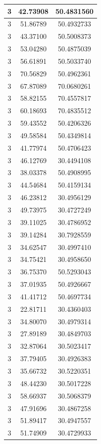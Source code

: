 \documentclass[
]{book}
\begin{document}
\begin{tabular}{c|c|c}
\hline
3 & 42.73908 & 50.4831560\\
\hline
3 & 51.86789 & 50.4932733\\
\hline
3 & 43.37100 & 50.5008373\\
\hline
3 & 53.04280 & 50.4875039\\
\hline
3 & 56.61891 & 50.5033740\\
\hline
3 & 70.56829 & 50.4962361\\
\hline
3 & 67.87089 & 70.0680261\\
\hline
3 & 58.82155 & 70.4557817\\
\hline
3 & 60.18693 & 70.4835512\\
\hline
3 & 59.43552 & 50.4206326\\
\hline
3 & 49.58584 & 50.4349814\\
\hline
3 & 41.77974 & 50.4706423\\
\hline
3 & 46.12769 & 30.4494108\\
\hline
3 & 38.03378 & 50.4908995\\
\hline
3 & 44.54684 & 50.4159134\\
\hline
3 & 46.23812 & 30.4956129\\
\hline
3 & 49.73975 & 30.4727249\\
\hline
3 & 39.11025 & 30.4786952\\
\hline
3 & 39.14284 & 30.7928559\\
\hline
3 & 34.62547 & 30.4997410\\
\hline
3 & 34.75421 & 30.4958650\\
\hline
3 & 36.75370 & 50.5293043\\
\hline
3 & 37.01935 & 50.4926667\\
\hline
3 & 41.41712 & 50.4697734\\
\hline
3 & 22.81711 & 30.4360403\\
\hline
3 & 34.80070 & 30.4979314\\
\hline
3 & 27.89189 & 30.4849703\\
\hline
3 & 32.87064 & 30.5023417\\
\hline
3 & 37.79405 & 30.4926383\\
\hline
3 & 35.66732 & 30.5220351\\
\hline
3 & 48.44230 & 30.5017228\\
\hline
3 & 58.66937 & 30.5068379\\
\hline
3 & 47.91696 & 30.4867258\\
\hline
3 & 51.89417 & 30.4947557\\
\hline
3 & 51.74909 & 30.4729933\\

\end{tabular}
\end{document}
